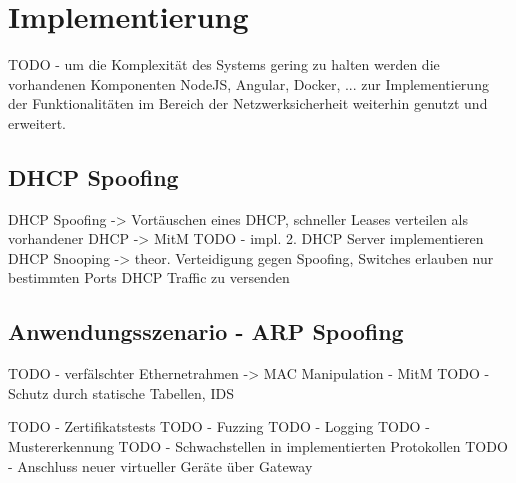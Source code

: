 \chapter{Implementierung}

TODO - um die Komplexität des Systems gering zu halten werden die vorhandenen Komponenten NodeJS, Angular, Docker, ... zur Implementierung der Funktionalitäten im Bereich der Netzwerksicherheit weiterhin genutzt und erweitert.

\section{DHCP Spoofing}
\label{Impl:DHCP Spoofing}
DHCP Spoofing -> Vortäuschen eines DHCP, schneller Leases verteilen als vorhandener DHCP -> MitM
TODO - impl. 2. DHCP Server implementieren
DHCP Snooping -> theor. Verteidigung gegen Spoofing, Switches erlauben nur bestimmten Ports DHCP Traffic zu versenden

\section{Anwendungsszenario - \ac{ARP} Spoofing}
TODO - verfälschter Ethernetrahmen -> MAC Manipulation - MitM
TODO - Schutz durch statische Tabellen, \ac{IDS}


TODO - Zertifikatstests
TODO - Fuzzing
TODO - Logging
TODO - Mustererkennung
TODO - Schwachstellen in implementierten Protokollen
TODO - Anschluss neuer virtueller Geräte über Gateway